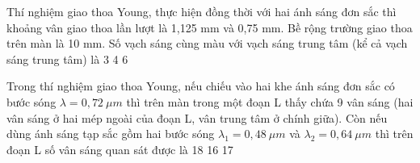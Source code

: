 \begin{ex}%
Thí nghiệm giao thoa Young, thực hiện đồng thời với hai ánh sáng đơn sắc thì khoảng vân giao thoa lần lượt là 1,125 mm và 0,75 mm. Bề rộng trường giao thoa trên màn là 10 mm. Số vạch sáng cùng màu với vạch sáng trung tâm (kể cả vạch sáng trung tâm) là
\choice
{3}
{4}
{}
{6}

\end{ex} 
 
\begin{ex}%
Trong thí nghiệm giao thoa Young, nếu chiếu vào hai khe ánh sáng đơn sắc có bước sóng $\lambda =0,72\ \mu m $ thì trên màn trong một đoạn L thấy chứa 9 vân sáng (hai vân sáng ở hai mép ngoài của đoạn L, vân trung tâm ở chính giữa). Còn nếu dùng ánh sáng tạp sắc gồm hai bước sóng $\lambda_1=0,48\ \mu m $ và $\lambda_2=0,64\ \mu m $ thì trên đoạn L số vân sáng quan sát được là
\choice
{18}
{16}
{17}
{}
\end{ex} 

